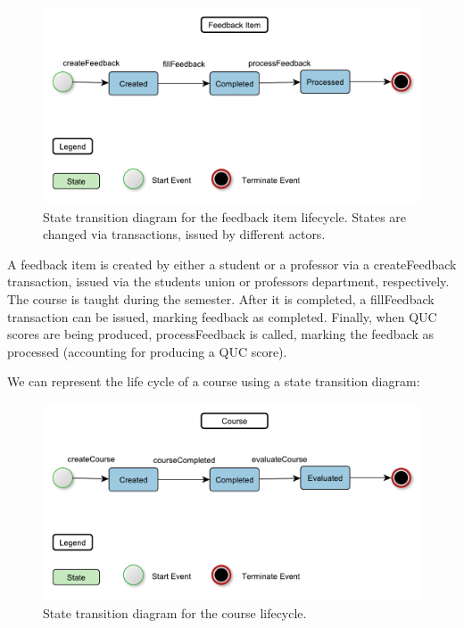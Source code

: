 \documentclass[12pt,a4paper]{article}
\theoremstyle{definition}
\begin{document}
\begin{figure}[h]
    \centering
    \includegraphics[scale=0.6]{figures/fig3.pdf}
    \caption{State transition diagram for the feedback item lifecycle. States are changed via transactions, issued by different actors.}
    \label{fig:feedback_item_lc}
\end{figure}

A feedback item is created by either a student or a professor via a createFeedback transaction, issued via the students union or professors department, respectively. The course is taught during the semester. After it is completed, a fillFeedback transaction can be issued, marking feedback as completed. Finally, when QUC scores are being produced, processFeedback is called, marking the feedback as processed (accounting for producing a QUC score).

We can represent the life cycle of a course using a state transition diagram:

\begin{figure}[h!]
    \centering
    \includegraphics[scale=0.6]{figures/fig4.pdf}
    \caption{State transition diagram for the course lifecycle.}
    \label{fig:course_lf}
\end{figure}
\end{document}
